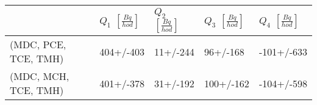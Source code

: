 \begin{tabular}{lllll}
\toprule
{} & $Q_1$ $\left[\si{\frac{Bq}{hod}}\right]$ & $Q_2$ $\left[\si{\frac{Bq}{hod}}\right]$ & $Q_3$ $\left[\si{\frac{Bq}{hod}}\right]$ & $Q_4$ $\left[\si{\frac{Bq}{hod}}\right]$ \\
\midrule
(MDC, PCE, TCE, TMH) &   404+/-403 &     11+/-244 &       96+/-168 &   -101+/-633 \\
(MDC, MCH, TCE, TMH) &   401+/-378 &     31+/-192 &      100+/-162 &   -104+/-598 \\
\bottomrule
\end{tabular}
